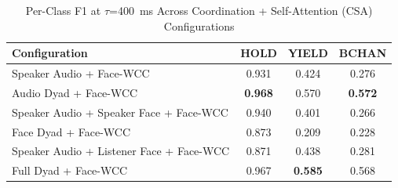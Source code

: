 \begin{table}[h]
\caption{Per-Class F1 at $\tau$=400~ms Across Coordination + Self-Attention (CSA) Configurations}
\label{tab:f1_per_class_csa}
\small
\renewcommand{\arraystretch}{1.20}
\begin{tabular}{>{\raggedright\arraybackslash}p{4cm}ccc}
\toprule
Configuration & HOLD & YIELD & BCHAN \\
\midrule
Speaker Audio + Face-WCC & 0.931 & 0.424 & 0.276 \\
Audio Dyad + Face-WCC & \textbf{0.968} & 0.570 & \textbf{0.572} \\
Speaker Audio + Speaker Face + Face-WCC & 0.940 & 0.401 & 0.266 \\
Face Dyad + Face-WCC & 0.873 & 0.209 & 0.228 \\
Speaker Audio + Listener Face + Face-WCC & 0.871 & 0.438 & 0.281 \\
Full Dyad + Face-WCC & 0.967 & \textbf{0.585} & 0.568 \\
\bottomrule
\end{tabular}
\end{table}
